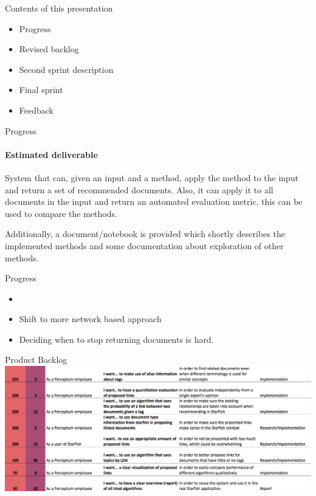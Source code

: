 
\begin{frame}[t,plain]
\titlepage
\end{frame}

\begin{frame}[t]{Contents of this presentation}
\begin{itemize}
	\item Progress
	\item Revised backlog
	\item Second sprint description 
	\item Final sprint 
	\item Feedback
\end{itemize}
\end{frame}

\begin{frame}[t]{Progress}
\framesubtitle{Estimated deliverable}

\vspace{1 em}
System that can, given an input and a method, apply the method to the input and return a set of recommended documents. Also, it can apply it to all documents in the input and return an automated evaluation metric, this can be used to compare the methods. 

\vspace{1em}
Additionally, a document/notebook is provided which shortly describes the implemented methods and some documentation about exploration of other methods. 
\end{frame}

\begin{frame}[t]{Progress}

\begin{itemize}
	\item 

	\item Shift to more network based approach

	\item Deciding when to stop returning documents is hard.	
\end{itemize}
\end{frame}


\begin{frame}[t]{Product Backlog}
\includegraphics[width=\linewidth]{backlog2}
\end{frame}

